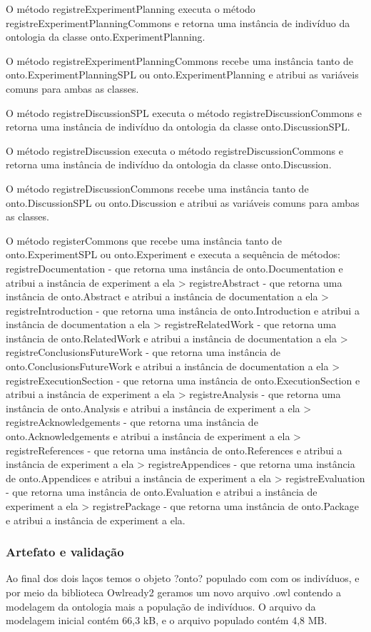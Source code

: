 O método registreExperimentPlanning executa o método registreExperimentPlanningCommons e retorna uma instância de indivíduo da ontologia da classe onto.ExperimentPlanning.

O método registreExperimentPlanningCommons recebe uma instância tanto de onto.ExperimentPlanningSPL ou onto.ExperimentPlanning e atribui as variáveis comuns para ambas as classes.

O método registreDiscussionSPL executa o método registreDiscussionCommons e retorna uma instância de indivíduo da ontologia da classe onto.DiscussionSPL.

O método registreDiscussion executa o método registreDiscussionCommons e retorna uma instância de indivíduo da ontologia da classe onto.Discussion.

O método registreDiscussionCommons recebe uma instância tanto de onto.DiscussionSPL ou onto.Discussion e atribui as variáveis comuns para ambas as classes.

O método registerCommons que recebe uma instância tanto de onto.ExperimentSPL ou onto.Experiment e executa a sequência de métodos:  registreDocumentation - que retorna uma instância de onto.Documentation e atribui a instância de experiment a ela > registreAbstract - que retorna uma instância de onto.Abstract e atribui a instância de documentation a ela > registreIntroduction - que retorna uma instância de onto.Introduction e atribui a instância de documentation a ela > registreRelatedWork - que retorna uma instância de onto.RelatedWork e atribui a instância de documentation a ela > registreConclusionsFutureWork - que retorna uma instância de onto.ConclusionsFutureWork e atribui a instância de documentation a ela > registreExecutionSection - que retorna uma instância de onto.ExecutionSection e atribui a instância de experiment a ela > registreAnalysis - que retorna uma instância de onto.Analysis e atribui a instância de experiment a ela > registreAcknowledgements - que retorna uma instância de onto.Acknowledgements e atribui a instância de experiment a ela > registreReferences - que retorna uma instância de onto.References e atribui a instância de experiment a ela > registreAppendices - que retorna uma instância de onto.Appendices e atribui a instância de experiment a ela > registreEvaluation - que retorna uma instância de onto.Evaluation e atribui a instância de experiment a ela > registrePackage - que retorna uma instância de onto.Package e atribui a instância de experiment a ela.

\subsubsection{Artefato e validação}
Ao final dos dois laços temos o objeto ?onto? populado com com os indivíduos, e por meio da biblioteca Owlready2 geramos um novo arquivo .owl contendo a modelagem da ontologia mais a população de indivíduos. O arquivo da modelagem inicial contém 66,3 kB, e o arquivo populado contém 4,8 MB.

